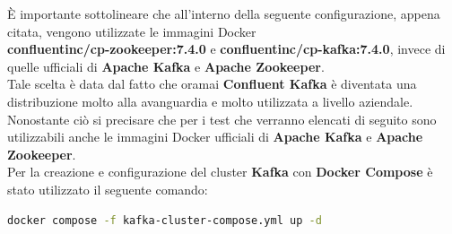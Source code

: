 È importante sottolineare che all'interno della seguente configurazione, appena citata, vengono utilizzate le \gls{immagini Docker}{} \\\textbf{confluentinc/cp-zookeeper:7.4.0} e \textbf{confluentinc/cp-kafka:7.4.0}, invece 
di quelle ufficiali di \textbf{Apache Kafka} e \textbf{Apache Zookeeper}.\\
Tale scelta è data dal fatto che oramai  \textbf{Confluent Kafka} è diventata una distribuzione molto alla avanguardia e molto utilizzata 
a livello aziendale.\\
Nonostante ciò si precisare che per i test che verranno elencati di seguito
sono utilizzabili anche le \gls{immagini Docker}{} ufficiali di \textbf{Apache Kafka} e \textbf{Apache Zookeeper}.\\
Per la creazione e configurazione del \gls{cluster}{} \textbf{Kafka} con \textbf{Docker Compose} è stato utilizzato il seguente comando:
\begin{lstlisting}[language=bash]
    docker compose -f kafka-cluster-compose.yml up -d
\end{lstlisting}
